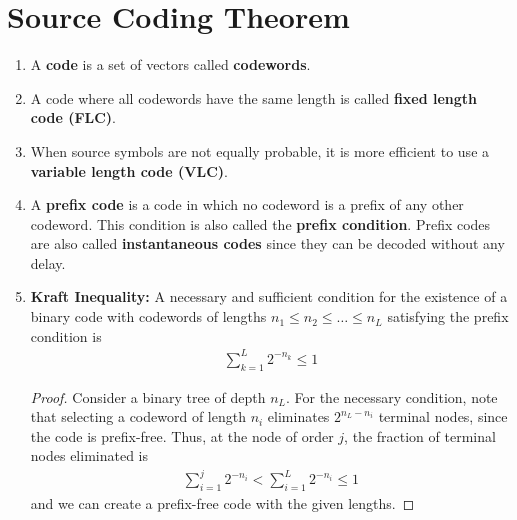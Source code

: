 \documentclass[journal,12pt,twocolumn]{IEEEtran}
\renewcommand\thesection{\arabic{section}}
\begin{document}
\section{Source Coding Theorem}
\begin{enumerate}[label=\thesection.\arabic*, ref=\thesection.\theenumi]
    \item A \textbf{code} is a set of vectors called \textbf{codewords}.
    \item A code where all codewords have the same length is called 
    \textbf{fixed length code (FLC)}.
    \item When source symbols are not equally probable, it is more efficient to 
    use a \textbf{variable length code (VLC)}.
    \item A \textbf{prefix code} is a code in which no codeword is a prefix of 
    any other codeword. This condition is also called the \textbf{prefix 
    condition}. Prefix codes are also called \textbf{instantaneous codes} since
    they can be decoded without any delay.
    \item \textbf{Kraft Inequality:} A necessary and sufficient condition for 
    the existence of a binary code with codewords of lengths $n_1 \le n_2 
    \le \ldots \le n_L$ satisfying the prefix condition is 
    \begin{align}
        \sum_{k=1}^L2^{-n_k} \le 1
        \label{eq:kraft}
    \end{align}
    \begin{proof}
        Consider a binary tree of depth $n_L$. For the necessary condition, note 
        that selecting a codeword of length $n_i$ eliminates $2^{n_L-n_i}$ 
        terminal nodes, since the code is prefix-free. Thus, at the node of order 
        $j$, the fraction of terminal nodes eliminated is 
        \begin{align}
            \sum_{i=1}^j2^{-n_i} < \sum_{i=1}^L2^{-n_i} \le 1
            \label{eq:kraft-necessary}
        \end{align}
        and we can create a prefix-free code with the given lengths.


\end{proof}
\end{enumerate}
\end{document}

